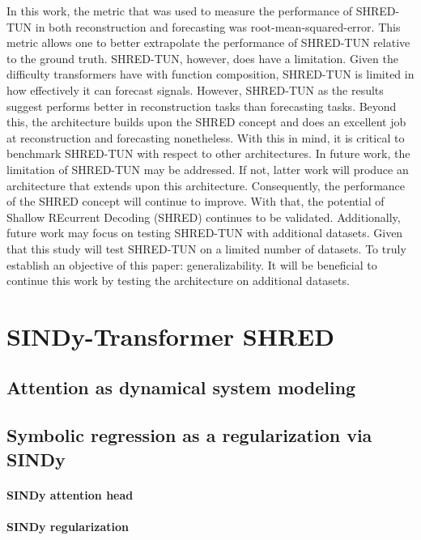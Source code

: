 \documentclass[11pt, a4paper]{article}
\begin{document}
In this work, the metric that was used to measure the performance of SHRED-TUN in both reconstruction and forecasting was root-mean-squared-error. This metric allows one to better
extrapolate the performance of SHRED-TUN relative to the ground truth.
SHRED-TUN, however, does have a limitation. Given the difficulty transformers have with function
composition, SHRED-TUN is limited in how effectively it can forecast signals. However, SHRED-TUN
as the results suggest performs better in reconstruction tasks than forecasting tasks. Beyond this, the
architecture builds upon the SHRED concept and does an excellent job at reconstruction and forecasting
nonetheless. With this in mind, it is critical to benchmark SHRED-TUN with respect to other architectures.
In future work, the limitation of SHRED-TUN may be addressed. If not, latter work will produce an
architecture that extends upon this architecture. Consequently, the performance of the SHRED concept will
continue to improve. With that, the potential of Shallow REcurrent Decoding (SHRED) continues to be
validated. Additionally, future work may focus on testing SHRED-TUN with additional datasets. Given
that this study will test SHRED-TUN on a limited number of datasets. To truly establish an objective of this
paper: generalizability. It will be beneficial to continue this work by testing the architecture on additional
datasets.

\section{SINDy-Transformer SHRED}
\label{sec:sindy_t_shred}
\subsection{Attention as dynamical system modeling}

\subsection{Symbolic regression as a regularization via SINDy}

\paragraph{SINDy attention head}

\paragraph{SINDy regularization}
\end{document}
